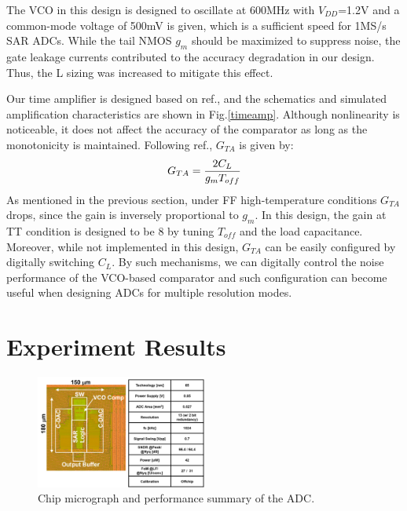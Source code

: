 \documentclass[journal]{IEEEtran}
\begin{document}
The VCO in this design is designed to oscillate at 600MHz with $V_{DD}$=1.2V and a common-mode voltage of 500mV is given, which is a sufficient speed for 1MS/s SAR ADCs. While the tail NMOS $g_m$ should be maximized to suppress noise, the gate leakage currents contributed to the accuracy degradation in our design. Thus, the L sizing was increased to mitigate this effect. 

Our time amplifier is designed based on ref.\cite{lee20089}, and the schematics and simulated amplification characteristics are shown in Fig.\ref{timeamp}. 
Although nonlinearity is noticeable, it does not affect the accuracy of the comparator as long as the monotonicity is maintained.
Following ref.\cite{lee20089}, $G_{TA}$ is given by:
\begin{eqnarray}
    \centering
    G_{TA} = \frac{2C_L}{g_mT_{off}}
    \label{gta}
\end{eqnarray}
As mentioned in the previous section, under FF high-temperature conditions $G_{TA}$ drops, since the gain is inversely proportional to $g_m$.
In this design, the gain at TT condition is designed to be 8 by tuning $T_{off}$ and the load capacitance. Moreover, while not implemented in this design, $G_{TA}$ can be easily configured by digitally switching $C_L$. By such mechanisms, we can digitally control the noise performance of the VCO-based comparator and such configuration can become useful when designing ADCs for multiple resolution modes\cite{harpe201310b}.

\section{Experiment Results}
\begin{figure}[!t]
\centering
 \includegraphics[width=0.5\textwidth]{figs/chipphoto.png}
  \caption{Chip micrograph and performance summary of the ADC.}
  \label{chipphoto}
\end{figure}
\end{document}
